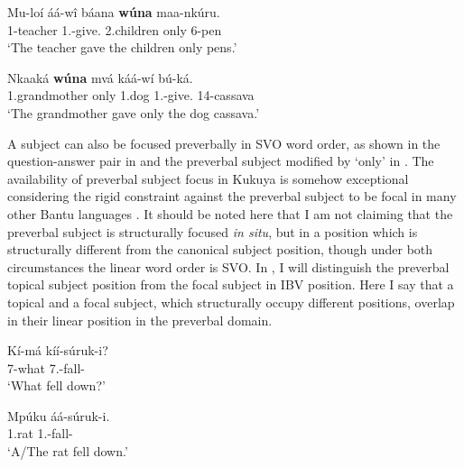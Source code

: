 \documentclass[output=paper,colorlinks,citecolor=brown,
]{langscibook}
\begin{document}
\begin{exe} 
    \ex  \label{9}
    \begin{xlist}
\ex
\label{9a}
\gll
Mu-loí áá-wî báana \textbf{wúna} maa-nkúru.\\
1-teacher 1\Sm{}.\Pst{}-give.\Pst{} 2.children only 6-pen\\
\trans ‘The teacher gave the children only pens.’

\ex
\label{9b}
\gll
Nkaaká \textbf{wúna} mvá káá-w\'{i} b\'{u}-ká.\\
1.grandmother only 1.dog 1\Sm{}.\Pst{}-give.\Pst{} 14-cassava\\
\trans ‘The grandmother gave only the dog cassava.’

\end{xlist}
\end{exe}
A subject can also be focused preverbally in SVO word order, as shown in the question-answer pair in  and the preverbal subject modified by `only' in . The availability of preverbal subject focus in Kukuya is somehow exceptional considering the rigid constraint against the preverbal subject to be focal in many other Bantu languages \citep{Morimoto2000, Zerbian2006, vanderWal2009a, vanderWal2015, DowningMarten2019}. It should be noted here that I am not claiming that the preverbal subject is structurally focused \textit{in situ}, but in a position which is structurally different from the canonical subject position, though under both circumstances the linear word order is SVO. In , I will distinguish the preverbal topical subject position from the focal subject in IBV position. Here I say that a topical and a focal subject, which structurally occupy different positions, overlap in their linear position in the preverbal domain. 
\begin{exe}
    \ex \label{10}
    \begin{xlist}
\ex
\label{10a}
\gll
Kí-má	kíí-súruk-i?\\
7-what	7\Sm{}.\Pst{}-fall-\Pst{}\\
\trans ‘What fell down?’

\ex
\label{10b}
\gll
Mpúku áá-súruk-i.\\
1.rat 1\Sm{}.\Pst{}-fall-\Pst{}\\
\trans ‘A/The rat fell down.’

    \end{xlist}
\end{exe}
\end{document}
